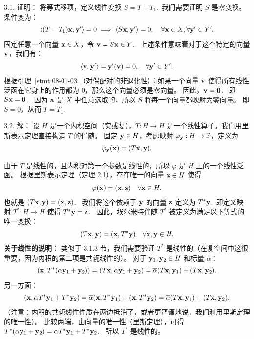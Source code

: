 \begin{exer}
\vspace{5ex}

3.1. 证明：
将等式移项，定义线性变换 $S = T - T_1$.~我们需要证明 $S$ 是零变换。
条件变为：
$$ \langle (T - T_1)\mathbf{x}, \mathbf{y}' \rangle = 0 \implies \langle S\mathbf{x}, \mathbf{y}' \rangle = 0, \quad \forall \mathbf{x} \in X, \forall \mathbf{y}' \in Y'. $$
固定任意一个向量 $\mathbf{x} \in X$，令 $\mathbf{v} = S\mathbf{x} \in Y$.~
上述条件意味着对于这个特定的向量 $\mathbf{v}$，我们有：
$$ \langle \mathbf{v}, \mathbf{y}' \rangle = \mathbf{y}'(\mathbf{v}) = 0, \quad \forall \mathbf{y}' \in Y'. $$
根据引理~\ref{stmt:08-01-03}（对偶配对的非退化性）：如果一个向量 $\mathbf{v}$ 使得所有线性泛函在它身上的作用都为 0，那么这个向量必须是零向量。
因此，$\mathbf{v} = \mathbf{0}$.~
即 $S\mathbf{x} = \mathbf{0}$.~
因为 $\mathbf{x}$ 是 $X$ 中任意选取的，所以 $S$ 将每一个向量都映射为零向量。
即 $S = 0$，从而 $T = T_1$.~

3.2. 解：
设 $H$ 是一个内积空间（实或复），$T: H \to H$ 是一个线性算子。我们用里斯表示定理直接构造 $T$ 的伴随。
固定 $\mathbf{y} \in H$，考虑映射 $\varphi_{\mathbf{y}}: H \to \mathbb{F}$，定义为
$$ \varphi_{\mathbf{y}}(\mathbf{x}) = (T\mathbf{x}, \mathbf{y}). $$

由于 $T$ 是线性的，且内积对第一个参数是线性的，所以 $\varphi$ 是 $H$ 上的一个线性泛函。
根据里斯表示定理（定理 2.1），存在唯一的向量 $\mathbf{z} \in H$ 使得
$$ \varphi(\mathbf{x}) = (\mathbf{x}, \mathbf{z}) \quad \forall \mathbf{x} \in H. $$
也就是 $(T\mathbf{x}, \mathbf{y}) = (\mathbf{x}, \mathbf{z})$.~
我们将这个依赖于 $\mathbf{y}$ 的向量 $\mathbf{z}$ 定义为 $T^*\mathbf{y}$.~即定义映射 $T^*: H \to H$ 使得 $T^*\mathbf{y} = \mathbf{z}$.~
因此，埃尔米特伴随 $T^*$ 被定义为满足以下等式的唯一变换：
$$ (T\mathbf{x}, \mathbf{y}) = (\mathbf{x}, T^*\mathbf{y}) \quad \forall \mathbf{x}, \mathbf{y} \in H. $$
\textbf{关于线性的说明}：
类似于 3.1.3 节，我们需要验证 $T^*$ 是线性的（在复空间中这很重要，因为内积的第二项是共轭线性的）。
对于 $\mathbf{y}_1, \mathbf{y}_2 \in H$ 和标量 $\alpha$：
$$ (\mathbf{x}, T^*(\alpha \mathbf{y}_1 + \mathbf{y}_2)) = (T\mathbf{x}, \alpha \mathbf{y}_1 + \mathbf{y}_2) = \overline{\alpha}(T\mathbf{x}, \mathbf{y}_1) + (T\mathbf{x}, \mathbf{y}_2). $$
另一方面：
$$ (\mathbf{x}, \alpha T^*\mathbf{y}_1 + T^*\mathbf{y}_2) = \overline{\alpha}(\mathbf{x}, T^*\mathbf{y}_1) + (\mathbf{x}, T^*\mathbf{y}_2) = \overline{\alpha}(T\mathbf{x}, \mathbf{y}_1) + (T\mathbf{x}, \mathbf{y}_2). $$
（注意：内积的共轭线性性质在两边抵消了，或者更严谨地说，我们利用里斯定理的唯一性）。
比较两端，由向量的唯一性（里斯定理），可得 $T^*(\alpha \mathbf{y}_1 + \mathbf{y}_2) = \alpha T^*\mathbf{y}_1 + T^*\mathbf{y}_2$.~
所以 $T^*$ 是线性的。


\end{exer}
